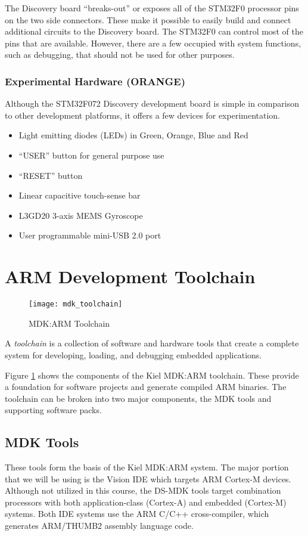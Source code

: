 \documentclass[11pt,fleqn]{book} %
\begin{document}
The Discovery board ``breaks-out'' or exposes all of the STM32F0 processor pins on the two side connectors. These make it possible to easily build and connect additional circuits to the Discovery board. The STM32F0 can control most of the pins that are available. However, there are a few occupied with system functions, such as debugging, that should not be used for other purposes. 

\subsubsection*{Experimental Hardware  ({\color{orange!90!black}ORANGE})}
Although the STM32F072 Discovery development board is simple in comparison to other development platforms, it offers a few devices for experimentation.

\begin{itemize}
	\item Light emitting diodes (LEDs) in Green, Orange, Blue and Red
	\item ``USER'' button for general purpose use
	\item ``RESET'' button
	\item Linear capacitive touch-sense bar
	\item L3GD20 3-axis MEMS Gyroscope
	\item User programmable mini-USB 2.0 port
\end{itemize}
	

\section{ARM Development Toolchain}

\begin{figure}[]
	\centering\texttt{[image: mdk\_toolchain]}
	\caption{MDK:ARM Toolchain}
	\label{mdk_toolchain}
\end{figure}

A \textit{toolchain} is a collection of software and hardware tools that create a complete system for developing, loading, and debugging embedded applications. 

Figure \ref{mdk_toolchain} shows the components of the Kiel MDK:ARM toolchain. These provide a foundation for software projects and generate compiled ARM binaries. 
The toolchain can be broken into two major components, the MDK tools and supporting software packs.

\subsection*{MDK Tools}
These tools form the basis of the Kiel MDK:ARM system. The major portion that we will be using is the {\textmu}Vision IDE which targets ARM Cortex-M devices. Although not utilized in this course, the DS-MDK tools target combination processors with both application-class (Cortex-A) and embedded (Cortex-M) systems. Both IDE systems use the ARM C/C++ cross-compiler, which generates ARM/THUMB2 assembly language code.
\end{document}
